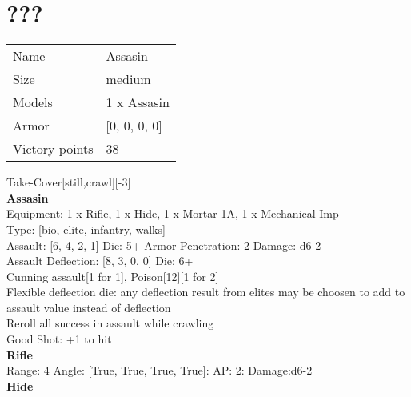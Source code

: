 \pagebreak\pagebreak



\section{???}

\begin{tabular}{ll}
  Name & Assasin\\
  Size & medium\\
  Models & 1 x Assasin\\
  Armor & [0, 0, 0, 0]\\
  Victory points & 38\\
\end{tabular}


Take-Cover[still,crawl][-3]\\ 


{\bf Assasin } \\
Equipment: 1 x Rifle, 1 x Hide, 1 x Mortar 1A, 1 x Mechanical Imp \\
Type: [bio, elite, infantry, walks] \\

Assault: [6, 4, 2, 1] Die: 5+ Armor Penetration: 2 Damage: d6-2 \\
Assault Deflection: [8, 3, 0, 0] Die: 6+\\
\indent Cunning assault[1 for 1], Poison[12][1 for 2]\\ 
Flexible deflection die: any deflection result from elites may be choosen to add to assault value instead of deflection\\ 
Reroll all success in assault while crawling\\ 
 

Good Shot: +1 to hit\\ 



{\bf Rifle } \\



Range: 4  Angle: [True, True, True, True]: AP: 2: Damage:d6-2 \\




{\bf Hide } \\

